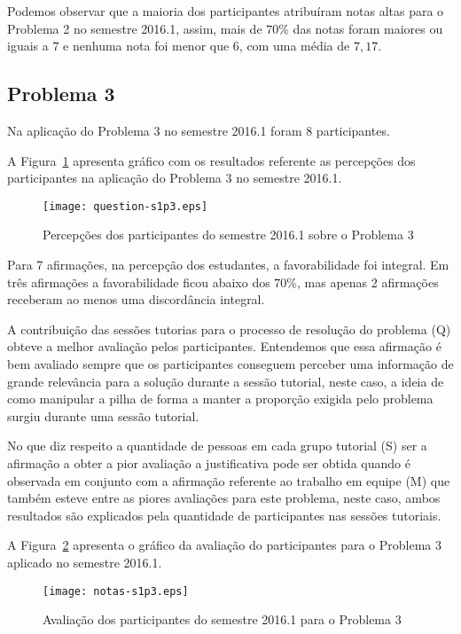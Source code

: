Podemos observar que a maioria dos participantes atribuíram
notas altas para o Problema 2 no semestre 2016.1, assim, mais de $70\%$ das notas
foram maiores ou iguais a $7$ e nenhuma nota foi menor que $6$, com uma média
de $7,17$.

\subsection{Problema 3}
Na aplicação do Problema 3 no semestre 2016.1 foram 8 participantes.

A Figura~\ref{percep-s1p3} apresenta gráfico com os resultados referente
as percepções dos participantes na aplicação do
Problema 3 no semestre 2016.1.

\begin{figure}[!htb]
\centering
\texttt{[image: question-s1p3.eps]}
\caption{Percepções dos participantes do semestre 2016.1 sobre o Problema 3}
\label{percep-s1p3}
\end{figure}

Para 7 afirmações, na percepção dos estudantes, a favorabilidade foi integral.
Em três afirmações a favorabilidade ficou abaixo dos $70\%$, mas apenas 2
afirmações receberam ao menos uma discordância integral.

A contribuição das sessões tutorias para o processo
de resolução do problema (Q) obteve a melhor avaliação pelos
participantes.
Entendemos que essa afirmação é bem avaliado sempre que
os participantes conseguem perceber uma informação de
grande relevância para a solução durante a sessão
tutorial, neste caso, a ideia de como manipular a pilha
de forma a manter a proporção exigida pelo problema
surgiu durante uma sessão tutorial.

No que diz respeito a quantidade de pessoas em
cada grupo tutorial (S) ser a afirmação a obter a pior
avaliação a justificativa pode ser obtida quando
é observada em conjunto com a afirmação referente ao
trabalho em equipe (M) que também esteve entre
as piores avaliações para este problema, neste caso,
ambos resultados são explicados pela quantidade de
participantes nas sessões tutoriais.

A Figura~\ref{aval-s1p3} apresenta o gráfico da
avaliação do participantes para o Problema 3 aplicado no semestre 2016.1.

\begin{figure}[!htb]
\centering
\texttt{[image: notas-s1p3.eps]}
\caption{Avaliação dos participantes do semestre 2016.1 para o Problema 3}
\label{aval-s1p3}
\end{figure}

